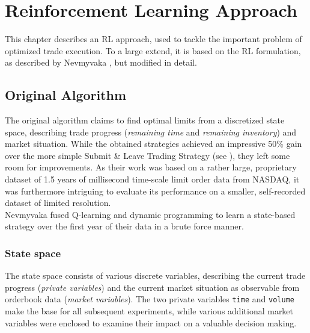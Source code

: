 \chapter{Reinforcement Learning Approach}
\label{chap:reinforcementlearning}
This chapter describes an \ac{RL} approach, used to tackle the important problem of optimized trade execution. To a large extend, it is based on the \ac{RL} formulation, as described by Nevmyvaka \etal \cite{Nevmyvaka:2006}, but modified in detail.\\

\section{Original Algorithm}
\label{chap:reinforcementlearning:original}
The original algorithm claims to find optimal limits from a discretized state space, describing trade progress (\ie \emph{remaining time} and \emph{remaining inventory}) and market situation. While the obtained strategies achieved an impressive 50\% gain over the more simple Submit \& Leave Trading Strategy (see ), they left some room for improvements. As their work was based on a rather large, proprietary dataset of 1.5 years of millisecond time-scale limit order data from \acs{NASDAQ}, it was furthermore intriguing to evaluate its performance on a smaller, self-recorded dataset of limited resolution.\\

Nevmyvaka \etal \cite{Nevmyvaka:2006} fused Q-learning and dynamic programming to learn a state-based strategy over the first year of their data in a brute force manner.

\subsection{State space}
\label{chap:statespace}
The state space consists of various discrete variables, describing the current trade progress (\emph{private variables}) and the current market situation as observable from orderbook data (\emph{market variables}). The two private variables \lstinline!time! and \lstinline!volume! make the base for all subsequent experiments, while various additional market variables were enclosed to examine their impact on a valuable decision making.\\

